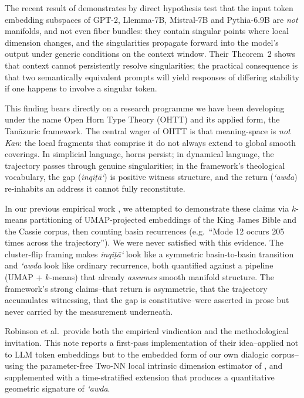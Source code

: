 \documentclass[11pt,a4paper]{article}
\theoremstyle{definition}
\begin{document}
The recent result of \cite{robinson2025token} demonstrates by direct
hypothesis test that the input token embedding subspaces of GPT-2,
Llemma-7B, Mistral-7B and Pythia-6.9B are \emph{not} manifolds, and not
even fiber bundles: they contain singular points where local dimension
changes, and the singularities propagate forward into the model's output
under generic conditions on the context window. Their Theorem~2 shows that
context cannot persistently resolve singularities; the practical
consequence is that two semantically equivalent prompts will yield
responses of differing stability if one happens to involve a singular
token.

This finding bears directly on a research programme we have been
developing under the name Open Horn Type Theory (OHTT) and its applied
form, the Tan\=azuric framework. The central wager of OHTT is that
meaning-space is \emph{not Kan}: the local fragments that comprise it do
not always extend to global smooth coverings. In simplicial language,
horns persist; in dynamical language, the trajectory passes through
genuine singularities; in the framework's theological vocabulary, the
gap (\textit{inqi\d{t}\=a`}) is positive witness structure, and the return
(\textit{`awda}) re-inhabits an address it cannot fully reconstitute.

In our previous empirical work
\cite{poernomo-kjv2026, poernomo-cassie2026}, we attempted to demonstrate
these claims via $k$-means partitioning of UMAP-projected embeddings of
the King James Bible and the Cassie corpus, then counting basin
recurrences (e.g.\ ``Mode 12 occurs 205 times across the trajectory'').
We were never satisfied with this evidence. The cluster-flip framing
makes \emph{inqi\d{t}\=a`} look like a symmetric basin-to-basin transition
and \emph{`awda} look like ordinary recurrence, both quantified against a
pipeline (UMAP + $k$-means) that already \emph{assumes} smooth manifold
structure. The framework's strong claims--that return is asymmetric, that
the trajectory accumulates witnessing, that the gap is constitutive--were
asserted in prose but never carried by the measurement underneath.

Robinson et al.\ provide both the empirical vindication and the
methodological invitation. This note reports a first-pass implementation
of their idea--applied not to LLM token embeddings but to the embedded
form of our own dialogic corpus--using the parameter-free Two-NN local
intrinsic dimension estimator of \cite{facco2017two}, and supplemented
with a time-stratified extension that produces a quantitative geometric
signature of \emph{`awda}.
\end{document}
